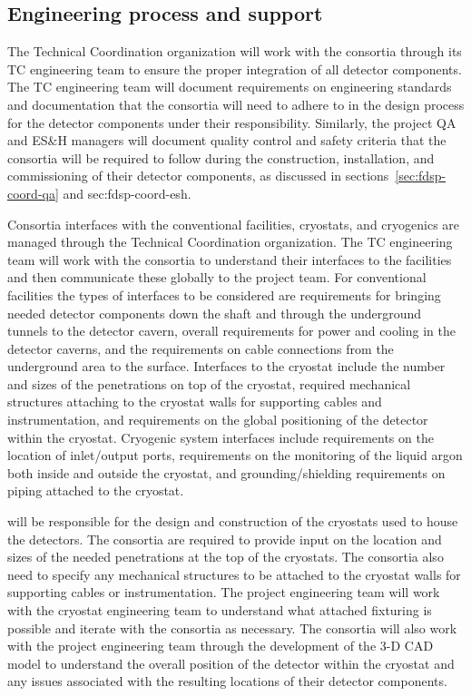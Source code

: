 \subsection{Engineering process and support}
\label{sec:fdsp-coord-integ-engr-proc}
 

The  Technical Coordination organization will work with the
consortia through its TC engineering team to ensure the proper
integration of all detector components.  The TC engineering team
will document requirements on engineering standards and documentation
that the consortia will need to adhere to in the design process for
the detector components under their responsibility.  Similarly, the
project QA and ES\&H managers will document quality control and safety
criteria that the consortia will be required to follow during the
construction, installation, and commissioning of their detector
components, as discussed in sections~\ref{sec:fdsp-coord-qa} and {sec:fdsp-coord-esh}.


Consortia interfaces with the conventional facilities, cryostats, and
cryogenics are managed through the  Technical Coordination
organization.  The TC engineering team will work with the
consortia to understand their interfaces to the facilities and then
communicate these globally to the  project team.  For conventional
facilities the types of interfaces to be considered are requirements
for bringing needed detector components down the shaft and through the
underground tunnels to the detector cavern, overall requirements for
power and cooling in the detector caverns, and the requirements on
cable connections from the underground area to the surface.
Interfaces to the cryostat include the number and sizes of the
penetrations on top of the cryostat, required mechanical structures
attaching to the cryostat walls for supporting cables and
instrumentation, and requirements on the global positioning of the
detector within the cryostat.  Cryogenic system interfaces include
requirements on the location of inlet/output ports, requirements on
the monitoring of the liquid argon both inside and outside the
cryostat, and grounding/shielding requirements on piping attached to
the cryostat.

 will be responsible for the design and construction of the
cryostats used to house the detectors.  The consortia are required to
provide input on the location and sizes of the needed penetrations at
the top of the cryostats.  The consortia also need to specify any
mechanical structures to be attached to the cryostat walls for
supporting cables or instrumentation.  The  project engineering
team will work with the  cryostat engineering team to understand
what attached fixturing is possible and iterate with the consortia as
necessary.  The consortia will also work with the project engineering
team through the development of the 3-D CAD model to understand the
overall position of the detector within the cryostat and any issues
associated with the resulting locations of their detector components.

